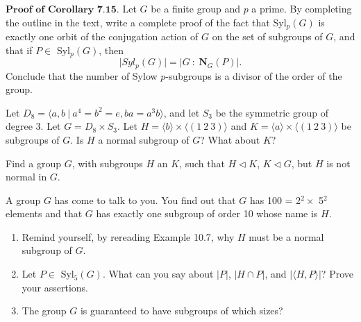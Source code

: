 \documentclass[12pt,letterpaper,boxed]{hmcpset}
\begin{document}

\begin{problem}[7.3.3]
$ \textbf{Proof of Corollary 7.15.} $ Let $G$ be a finite group and $p$ a prime. By completing the outline in the text, write a complete proof of the fact that Syl$_p(G)$ is exactly one orbit of the conjugation action of $G$ on the set of subgroups of $G$, and that if $P \in$ Syl$_p(G)$, then $$\vert Syl_p(G) \vert = \vert G \ : \ \textbf{N}_G(P) \vert. $$ Conclude that the number of Sylow $p$-subgroups is a divisor of the order of the group. 
\end{problem}

\begin{solution}

\end{solution}

\clearpage

\begin{problem}[10.1.2]
Let $ D_8 = \langle a,b \ \vert \ a^4 = b^2 = e, ba = a^3b \rangle $, and let $S_3$ be the symmetric group of degree 3. Let $ G = D_8 \times S_3 $. Let $ H = \langle b \rangle \times \langle (1 \ 2 \ 3) \rangle $ and $ K = \langle a \rangle \times \langle (1 \ 2 \ 3) \rangle $ be subgroups of $G$. Is $H$ a normal subgroup of $G$? What about $K$?
\end{problem}

\begin{solution}
\end{solution}

\clearpage

\begin{problem}[10.1.9]
Find a group $G$, with subgroups $H$ an $K$, such that $ H \triangleleft K $, $ K \triangleleft G $, but $H$ is not normal in $G$. 
\end{problem}

\begin{solution}
\end{solution}

\clearpage


\begin{problem}[10.1.13]
A group $G$ has come to talk to you. You find out that $G$ has 100 = 2$^2 \times $ 5$^2$ elements and that $G$ has exactly one subgroup of order 10 whose name is $H$. 
\begin{enumerate}[label=\alph*]
\item Remind yourself, by rereading Example 10.7, why $H$ must be a normal subgroup of $G$. 
\item Let $P \in$ Syl$_5(G)$. What can you say about $ \vert P \vert $, $ \vert H \cap P \vert $, and $ \vert \langle H, P \rangle \vert $? Prove your assertions. 
\item The group $G$ is guaranteed to have subgroups of which sizes?
\end{enumerate}
\end{problem}
\end{document}
